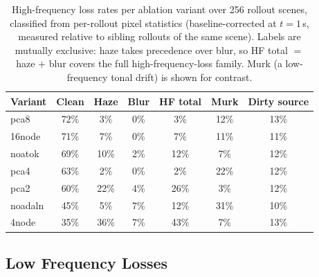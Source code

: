\begin{table}[t]
\centering
\caption{High-frequency loss rates per ablation variant over 256 rollout scenes, classified from per-rollout pixel statistics (baseline-corrected at $t{=}1$\,s, measured relative to sibling rollouts of the same scene). Labels are mutually exclusive: haze takes precedence over blur, so HF total $=$ haze $+$ blur covers the full high-frequency-loss family. Murk (a low-frequency tonal drift) is shown for contrast.}
\label{tab:hf-losses}
\begin{tabular}{lcccccc}
\hline
Variant & Clean & Haze & Blur & HF total & Murk & Dirty source \\
\hline
pca8            & 72\% & 3\%  & 0\% & 3\%  & 12\% & 13\% \\
16node          & 71\% & 7\%  & 0\% & 7\%  & 11\% & 11\% \\
noatok          & 69\% & 10\% & 2\% & 12\% & 7\%  & 12\% \\
pca4            & 63\% & 2\%  & 0\% & 2\%  & 22\% & 12\% \\
pca2            & 60\% & 22\% & 4\% & 26\% & 3\%  & 12\% \\
noadaln         & 45\% & 5\%  & 7\% & 12\% & 31\% & 10\% \\
4node           & 35\% & 36\% & 7\% & 43\% & 7\%  & 13\% \\
\hline
\end{tabular}
\end{table}

\subsection{Low Frequency Losses}
\label{sec:lf-losses}

